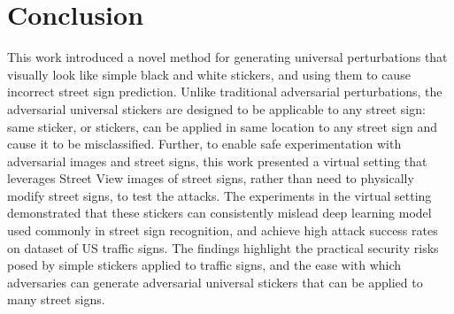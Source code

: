 \section{Conclusion}
\label{sec_conclusion}

This work introduced a novel method for generating universal perturbations that visually look like simple black and white stickers, and using them to cause incorrect street sign prediction. Unlike traditional adversarial perturbations, the adversarial universal stickers are designed to be applicable to any street sign: same sticker, or stickers, can be applied in same location to any street sign and cause it to be misclassified. Further, to enable safe experimentation with adversarial images and street signs, this work presented a virtual setting that leverages Street View images of street signs, rather than need to physically modify street signs, to test the attacks. The experiments in the virtual setting demonstrated that these stickers can consistently mislead deep learning model used commonly in street sign recognition, and achieve high attack success rates on dataset of US traffic signs. The findings highlight the practical security risks posed by simple stickers applied to traffic signs, and the ease with which adversaries can generate adversarial universal stickers that can be applied to many street signs.